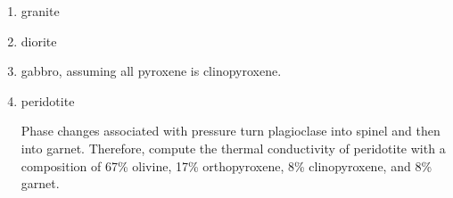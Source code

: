 \begin{enumerate}
    \item granite
    \item diorite
    \item gabbro, assuming all pyroxene is clinopyroxene.
    \item peridotite

    Phase changes associated with pressure turn plagioclase into spinel and
    then into garnet.  Therefore, compute the thermal conductivity of
    peridotite with a composition of 67\% olivine, 17\%
    orthopyroxene, 8\% clinopyroxene, and 8\% garnet.
\end{enumerate}
\FloatBarrier

